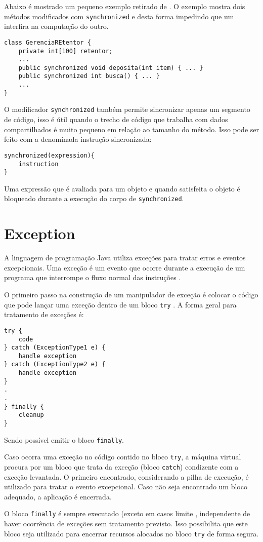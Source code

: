 Abaixo é mostrado um pequeno exemplo retirado de \cite{sebesta}. O exemplo
mostra dois métodos modificados com \texttt{synchronized} e desta forma
impedindo que um interfira na computação do outro.

\begin{lstlisting}
class GerenciaREtentor {
    private int[100] retentor;
    ...
    public synchronized void deposita(int item) { ... }
    public synchronized int busca() { ... }
    ...
}
\end{lstlisting}

O modificador \texttt{synchronized} também permite sincronizar apenas um
segmento de código, isso é útil quando o trecho de código que trabalha com
dados compartilhados é muito pequeno em relação ao tamanho do método. Isso
pode ser feito com a denominada instrução sincronizada:

\begin{lstlisting}
synchronized(expression){
    instruction
}
\end{lstlisting}

Uma expressão que é avaliada para um objeto e quando
satisfeita o objeto é bloqueado durante a execução do corpo de
\texttt{synchronized}.

\section{Exception}

A linguagem de programação Java utiliza exceções para tratar erros e
eventos excepcionais. Uma exceção é um evento que ocorre durante
a execução de um programa que interrompe o fluxo normal das instruções
\cite{except}.

O primeiro passo na construção de um manipulador de exceção é colocar
o código que pode lançar uma exceção dentro de um bloco
\texttt{try} \cite{try1}. A forma geral para tratamento de exceções é:
\begin{lstlisting}
try {
    code
} catch (ExceptionType1 e) {
    handle exception
} catch (ExceptionType2 e) {
    handle exception
}
.
.
} finally {
    cleanup
}
\end{lstlisting}
Sendo possível emitir o bloco \texttt{finally}.

Caso ocorra uma exceção no código contido no bloco \texttt{try},
a máquina virtual procura por um bloco que trata da exceção (bloco
\texttt{catch}) condizente com a exceção levantada. O primeiro
encontrado, considerando a pilha de execução, é utilizado para tratar
o evento excepcional. Caso não seja encontrado um bloco adequado, a
aplicação é encerrada.

O bloco \texttt{finally} é sempre executado (exceto em casos limite
\cite{try1}, independente de haver 
ocorrência de exceções sem tratamento previsto. Isso possibilita que
este bloco seja utilizado para encerrar recursos alocados no bloco
\texttt{try} de forma segura.
